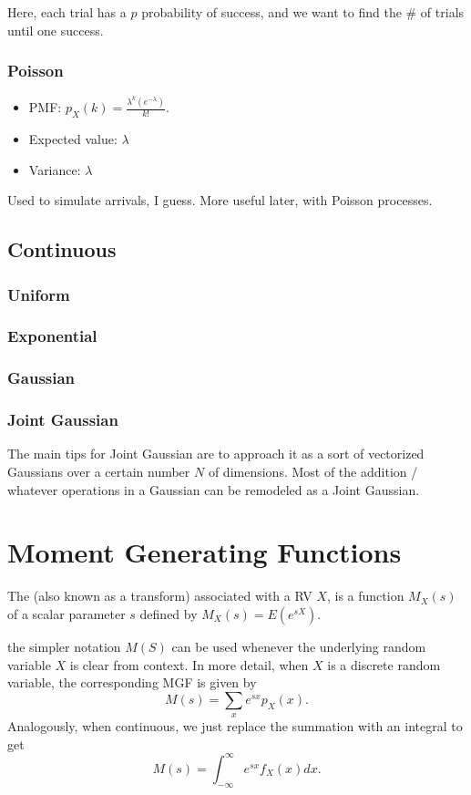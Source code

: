 \documentclass{article}
\begin{document}
Here, each trial has a $p$ probability of success, and we want to find the \# of trials until one success.
\subsubsection{Poisson}
\begin{itemize}
	\item PMF: $p_X(k) = \frac{\lambda^k(e^{-\lambda})}{k!}$.
	\item Expected value: $\lambda$
	\item Variance: $\lambda$
\end{itemize}

Used to simulate arrivals, I guess. More useful later, with Poisson processes.
\subsection{Continuous}
\subsubsection{Uniform}
\subsubsection{Exponential}
\subsubsection{Gaussian}
\subsubsection{Joint Gaussian}
The main tips for Joint Gaussian are to approach it as a sort of vectorized Gaussians over a certain number $N$ of dimensions. 
Most of the addition / whatever operations in a Gaussian can be remodeled as a Joint Gaussian.

\section{Moment Generating Functions}
\begin{definition}
    The  (also known as a transform) associated with a RV $X$, is a function $M_X(s)$ of a scalar parameter $s$ defined by $M_X(s) = E(e^{sX})$.
\end{definition}

the simpler notation $M(S)$ can be used whenever the underlying random variable $X$ is clear from context. In more detail, when $X$ is a discrete random variable, the corresponding MGF is given by \[M(s) = \sum_{x} e^{sx} p_X(x).\] Analogously, when continuous, we just replace the summation with an integral to get \[M(s) = \int_{-\infty}^{\infty} e^{sx} f_X(x) dx.\]
\end{document}
